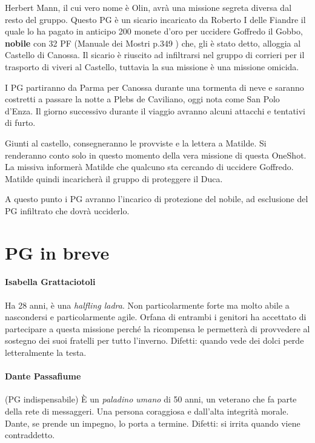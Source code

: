 \documentclass[letterpaper,twocolumn,openany,nodeprecatedcode]{dndbook}
\begin{document}
Herbert Mann, il cui vero nome è Olin, avrà una missione segreta diversa dal resto del gruppo. Questo PG è un sicario incaricato da Roberto I delle Fiandre il quale lo ha pagato in anticipo 200 monete d'oro per uccidere Goffredo il Gobbo, \textbf{nobile} con 32 PF (Manuale dei Mostri p.349 \cite{dnd:mostri}) che, gli è stato detto, alloggia al Castello di Canossa. Il sicario è riuscito ad infiltrarsi nel gruppo di corrieri per il trasporto di viveri al Castello, tuttavia la sua missione è una missione omicida.

I PG partiranno da Parma per Canossa durante una tormenta di neve e saranno costretti a passare la notte a Plebs de Caviliano, oggi nota come San Polo d'Enza. Il giorno successivo durante il viaggio avranno alcuni attacchi e tentativi di furto.

Giunti al castello, consegneranno le provviste e la lettera a Matilde. Si renderanno conto solo in questo momento della vera missione di questa OneShot. La missiva informerà Matilde che qualcuno sta cercando di uccidere Goffredo. Matilde quindi incaricherà il gruppo di proteggere il Duca.

A questo punto i PG avranno l'incarico di protezione del nobile, ad esclusione del PG infiltrato che dovrà ucciderlo.


\section{PG in breve}\label{PG}

\paragraph{Isabella Grattaciotoli} Ha 28 anni, è una \textit{halfling ladra}. Non particolarmente forte ma molto abile a nascondersi e particolarmente agile. Orfana di entrambi i genitori ha accettato di partecipare a questa missione perché la ricompensa le permetterà di provvedere al sostegno dei suoi fratelli per tutto l'inverno. Difetti: quando vede dei dolci perde letteralmente la testa.

\paragraph{Dante Passafiume} (PG indispensabile) È un \textit{paladino umano} di 50 anni, un veterano che fa parte della rete di messaggeri. Una persona coraggiosa e dall'alta integrità morale. Dante, se prende un impegno, lo porta a termine. Difetti: si irrita quando viene contraddetto.
\end{document}
